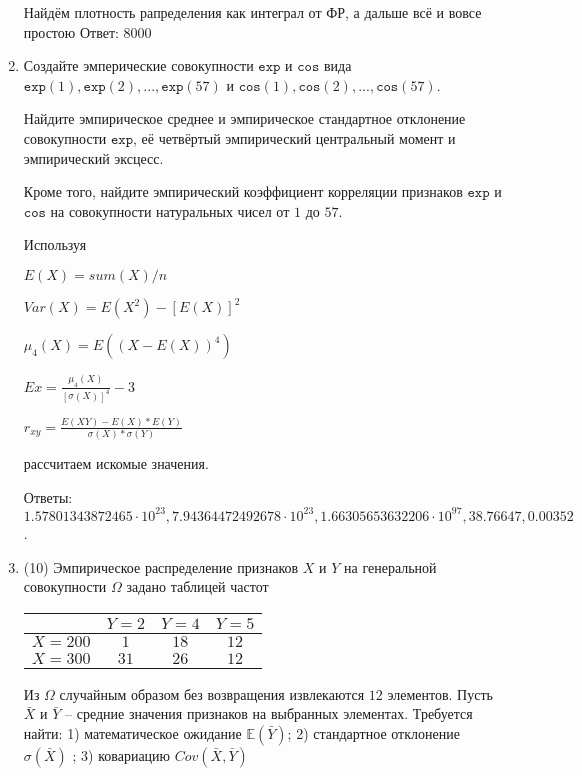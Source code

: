 \documentclass[a4paper,12pt]{article}
\begin{document}
\begin{enumerate}
Найдём плотность рапределения как интеграл от ФР, а дальше всё и вовсе простою Ответ: $8000$


\item

    
    Создайте эмперические совокупности  $\mathtt{\text{exp}}$ и $\mathtt{\text{cos}}$ вида $\mathtt{\text{exp}}(1),\mathtt{\text{exp}}(2), ..., \mathtt{\text{exp}}(57) $ и $\mathtt{\text{cos}}(1),\mathtt{\text{cos}}(2), ..., \mathtt{\text{cos}}(57). $

    Найдите эмпирическое среднее и эмпирическое стандартное отклонение совокупности $\mathtt{\text{exp}}$, её четвёртый эмпирический центральный момент и эмпирический эксцесс.

    Кроме того, найдите эмпирический коэффициент корреляции признаков $\mathtt{\text{exp}}$ и $\mathtt{\text{cos}}$ на совокупности натуральных чисел от $1$ до $57$.
    


    
    Используя

	$E(X) = sum(X) / n$

	$Var(X) = E(X^2) - [E(X)]^2$

	$\mu_4(X) = E((X-E(X))^4)$

	$Ex = \frac{\mu_4(X)}{[\sigma(X)]^4} - 3$

	$r_{xy} = \frac{E(XY) - E(X) * E(Y)}{\sigma(X) * \sigma(Y)}$

    рассчитаем искомые значения.

    Ответы: $1.57801343872465 \cdot 10^{23}, 7.94364472492678 \cdot 10^{23}, 1.66305653632206 \cdot 10^{97}, 38.76647, 0.00352$.

    

\item


(10) Эмпирическое распределение признаков $X$ и $Y$ на генеральной совокупности $\Omega$ задано таблицей частот  
 
\begin{tabular}{ | c | c | c | c | }
\hline
 & $Y = 2$ & $Y = 4$ & $Y = 5$  \\ \hline
$X = 200$ & $1$ & $18$ & $12$\\ \hline
$X = 300$ & $31$ & $26$ & $12$\\
\hline
\end{tabular}

Из $\Omega$ случайным образом без возвращения извлекаются $12$ элементов. 
Пусть $\bar X$ и $\bar Y$ – средние значения признаков на выбранных элементах. 
Требуется найти: 1) математическое ожидание $\mathbb{E}(\bar Y)$; 2) стандартное отклонение $\sigma(\bar X)$ ; 
3) ковариацию $Cov(\bar X, \bar Y)$





\end{enumerate}
\end{document}
